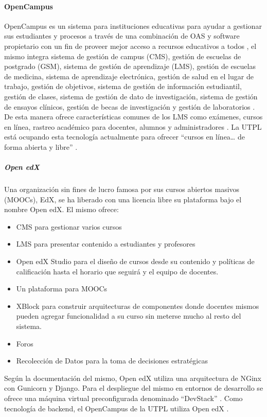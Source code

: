 \paragraph{OpenCampus}
OpenCampus es un sistema para instituciones educativas para ayudar a gestionar sus estudiantes y procesos a través de una combinación de OAS y software propietario con un fin de proveer mejor acceso a recursos educativos a todos \citep{OpenCampus-Tecnology}, el mismo integra sistema de gestión de campus (CMS), gestión de escuelas de postgrado (GSM), sistema de gestión de aprendizaje (LMS), gestión de escuelas de medicina, sistema de aprendizaje electrónica, gestión de salud en el lugar de trabajo, gestión de objetivos, sistema de gestión de información estudiantil, gestión de clases, sistema de gestión de dato de investigación, sistema de gestión de ensayos clínicos, gestión de becas de investigación y gestión de laboratorios \citep{OpenCampus-Home}. De esta manera ofrece características comunes de los LMS como exámenes, cursos en línea, rastreo académico para docentes, alumnos y administradores \citep{OpenCampus-Tecnology} \citep{OpenCampus-Universities}. La UTPL está ocupando esta tecnología actualmente para ofrecer “cursos en línea… de forma abierta y libre” \citep{UTPL-OpenCampus}.

\subparagraph{Open edX}
Una organización sin fines de lucro famosa por sus cursos abiertos masivos (MOOCs), EdX, se ha liberado con una licencia libre su plataforma bajo el nombre Open edX. El mismo ofrece:
\begin{itemize}
	\item CMS para gestionar varios cursos
    \item LMS para presentar contenido a estudiantes y profesores
    \item Open edX Studio para el diseño de cursos desde su contenido y políticas de calificación hasta el horario que seguirá y el equipo de docentes.
    \item Un plataforma para MOOCs
    \item XBlock para construir arquitecturas de componentes donde docentes mismos pueden agregar funcionalidad a su curso sin meterse mucho al resto del sistema.
    \item Foros
    \item Recolección de Datos para la toma de decisiones estratégicas
\end{itemize}
Según la documentación del mismo, Open edX utiliza una arquitectura de NGinx con Gunicorn y Django. Para el despliegue del mismo en entornos de desarrollo se ofrece una máquina virtual preconfigurada denominado “DevStack” \citep{edX-About-Open-edX}. Como tecnología de backend, el OpenCampus de la UTPL utiliza Open edX \citep{Lopez-Jorge}.

